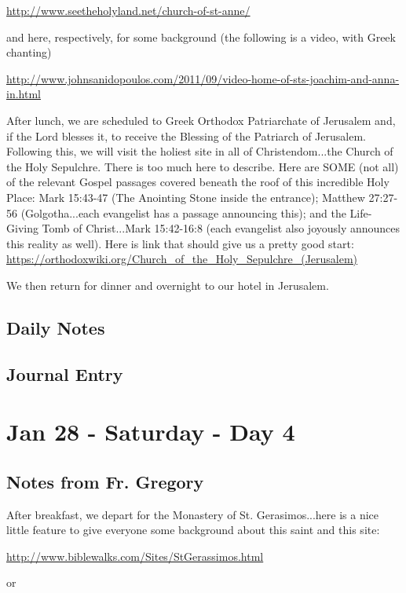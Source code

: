 \documentclass[letterpaper]{report}
\begin{document}
\url{http://www.seetheholyland.net/church-of-st-anne/}

and here, respectively, for some background  (the following is a video, with Greek chanting)

\url{http://www.johnsanidopoulos.com/2011/09/video-home-of-sts-joachim-and-anna-in.html}

After lunch, we are scheduled to Greek Orthodox Patriarchate of Jerusalem and, if the Lord blesses it, to receive the Blessing of the Patriarch of Jerusalem. Following this, we will visit the holiest site in all of Christendom...the Church of the Holy Sepulchre. There is too much here to describe. Here are SOME (not all) of the relevant Gospel passages covered beneath the roof of this incredible Holy Place: Mark 15:43-47 (The Anointing Stone inside the entrance); Matthew 27:27-56 (Golgotha...each evangelist has a passage announcing this); and the Life-Giving Tomb of Christ...Mark 15:42-16:8 (each evangelist also joyously announces this reality as well). Here is link that should give us a pretty good start:
\url{https://orthodoxwiki.org/Church_of_the_Holy_Sepulchre_(Jerusalem)}

We then return for dinner and overnight to our hotel in Jerusalem.


\subsection{Daily Notes}

\clearpage
\subsection{Journal Entry}

\clearpage
\section{Jan 28 - Saturday - Day 4}

\subsection{Notes from Fr. Gregory}
After breakfast, we depart for the Monastery of St. Gerasimos...here is a nice little feature to give everyone some background about this saint and this site:

\url{http://www.biblewalks.com/Sites/StGerassimos.html}

or
\end{document}
